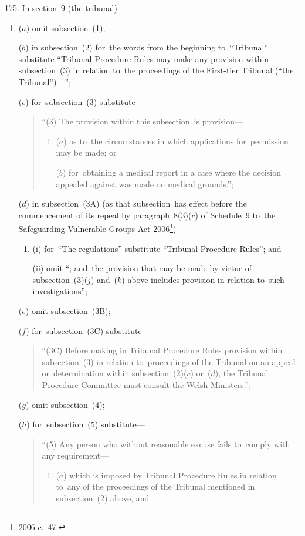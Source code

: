 \documentclass[12pt,a4paper]{article}
\begin{document}
175.  In section~9 (the tribunal)—
\begin{enumerate}\item[]
($a$) omit subsection~(1);

($b$) in subsection~(2) for~the words from the beginning to~“Tribunal” substitute “Tribunal Procedure Rules may make any provision within subsection~(3) in relation to~the proceedings of the First-tier Tribunal (“the Tribunal”)—”;

($c$) for~subsection~(3) substitute—
\begin{quotation}
“(3) The provision within this subsection~is provision—
\begin{enumerate}\item[]
($a$) as to~the circumstances in which applications for~permission may be made; or

($b$) for~obtaining a medical report in a case where the decision appealed against was made on medical grounds.”;
\end{enumerate}
\end{quotation}

($d$) in subsection~(3A) (as that subsection~has effect before the commencement of its repeal by paragraph~8(3)($c$)  of Schedule~9 to~the Safeguarding Vulnerable Groups Act 2006\footnote{2006 c.~47.})—
\begin{enumerate}\item[]
(i) for~“The regulations” substitute “Tribunal Procedure Rules”; and

(ii) omit “; and~the provision that may be made by virtue of subsection~(3)($j$)  and~($k$)  above includes provision in relation to~such investigations”;
\end{enumerate}

($e$) omit subsection~(3B);

($f$) for~subsection~(3C) substitute—
\begin{quotation}
“(3C) Before making in Tribunal Procedure Rules provision within subsection~(3) in relation to~proceedings of the Tribunal on an appeal or~determination within subsection~(2)($c$)  or~($d$), the Tribunal Procedure Committee must consult the Welsh Ministers.”;
\end{quotation}

($g$) omit subsection~(4);

($h$) for~subsection~(5) substitute—
\begin{quotation}
“(5) Any person who without reasonable excuse fails to~comply with any requirement—
\begin{enumerate}\item[]
($a$) which is imposed by Tribunal Procedure Rules in relation to~any of the proceedings of the Tribunal mentioned in subsection~(2) above, and


\end{enumerate}
\end{quotation}
\end{enumerate}
\end{document}
